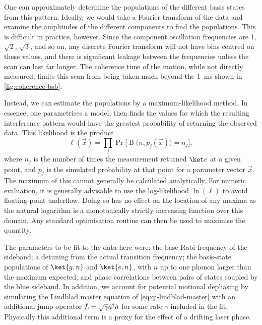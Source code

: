 One can approximately determine the populations of the different basis states from this pattern.
Ideally, we would take a Fourier transform of the data and examine the amplitudes of the different components to find the populations.
This is difficult in practice, however.
Since the component oscillation frequencies are 1, $\sqrt2$, $\sqrt3$, and so on, any discrete Fourier transform will not have bins centred on these values, and there is significant leakage between the frequencies unless the scan can last far longer.
The coherence time of the motion, while not directly measured, limits this scan from being taken much beyond the \qty{1}{\milli\s} shown in \cref{fig:coherence-bsb}.

Instead, we can estimate the populations by a maximum-likelihood method.
In essence, one parametrises a model, then finds the values for which the resulting interference pattern would have the greatest probability of returning the observed data.
This likelihood is the product
\begin{equation}
\ell(\vec x) = \prod_j \Pr\bigl[\operatorname B\bigl(n, p_j(\vec x)\bigr) = n_j\bigr],
\end{equation}
where $n_j$ is the number of times the measurement returned $\ket e$ at a given point, and $p_j$ is the simulated probability at that point for a parameter vector $\vec x$.
The maximum of this cannot generally be calculated analytically.
For numeric evaluation, it is generally advisable to use the log-likelihood $\ln(\ell)$ to avoid floating-point underflow.
Doing so has no effect on the location of any maxima as the natural logarithm is a monotonically strictly increasing function over this domain.
Any standard optimisation routine can then be used to maximise the quantity.

The parameters to be fit to the data here were: the base Rabi frequency of the sideband; a detuning from the actual transition frequency; the basis-state populations of $\ket{g,n}$ and $\ket{e,n}$, with $n$ up to one phonon larger than the maximum expected; and phase correlations between pairs of states coupled by the blue sideband.
In addition, we account for potential motional dephasing by simulating the Lindblad master equation of \cref{eq:qi-lindblad-master} with an additional jump operator $\hat{L} = \sqrt\gamma \hat{a}^\dagger\hat{a}$ for some rate $\gamma$ included in the fit.
Physically this additional term is a proxy for the effect of a drifting laser phase.

